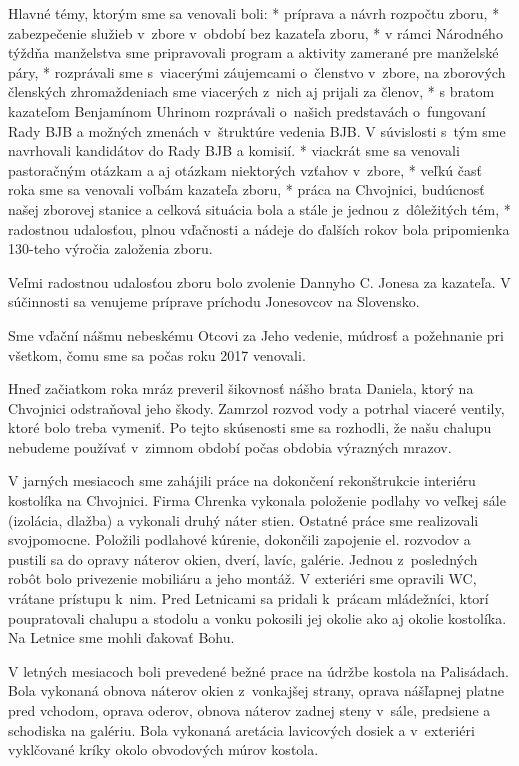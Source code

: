 Hlavné témy, ktorým sme sa venovali boli:
\begitems
* príprava a návrh rozpočtu zboru,
* zabezpečenie služieb v~zbore v~období bez kazateľa zboru,
* v rámci Národného týždňa manželstva sme pripravovali program a aktivity zamerané pre manželské páry,
* rozprávali sme s~viacerými záujemcami o~členstvo v~zbore, na zborových členských zhromaždeniach sme viacerých z~nich aj prijali za členov,
* s bratom kazateľom Benjamínom Uhrinom rozprávali o~našich predstavách o~fungovaní Rady BJB a možných zmenách v~štruktúre vedenia BJB. V súvislosti s~tým sme navrhovali kandidátov do Rady BJB a komisií.
* viackrát sme sa venovali pastoračným otázkam a aj otázkam niektorých vzťahov v~zbore,
* veľkú časť roka sme sa venovali voľbám kazateľa zboru,
* práca na Chvojnici, budúcnosť našej zborovej stanice a celková situácia bola a stále je jednou z~dôležitých tém,
* radostnou udalosťou, plnou vďačnosti a nádeje do ďalších rokov bola pripomienka 130-teho výročia založenia zboru.
\enditems

Veľmi radostnou udalosťou zboru bolo zvolenie Dannyho C. Jonesa za kazateľa. V súčinnosti sa venujeme príprave príchodu Jonesovcov na Slovensko.

Sme vďační nášmu nebeskému Otcovi za Jeho vedenie, múdrosť a požehnanie pri všetkom, čomu sme sa počas roku 2017 venovali.



Hneď začiatkom roka mráz preveril šikovnosť nášho brata Daniela, ktorý na Chvojnici odstraňoval jeho škody. Zamrzol rozvod vody a potrhal viaceré ventily, ktoré bolo treba vymeniť. Po tejto skúsenosti sme sa rozhodli, že našu chalupu nebudeme používať v~zimnom období počas obdobia výrazných mrazov.

V jarných mesiacoch sme zahájili práce na dokončení rekonštrukcie interiéru kostolíka na Chvojnici. Firma Chrenka vykonala položenie podlahy vo veľkej sále (izolácia, dlažba) a vykonali druhý náter stien. Ostatné práce sme realizovali svojpomocne. Položili podlahové kúrenie,  dokončili zapojenie el. rozvodov a  pustili sa do opravy náterov okien,  dverí, lavíc, galérie. Jednou z~posledných robôt bolo privezenie mobiliáru a jeho montáž. V exteriéri sme opravili WC, vrátane prístupu k~nim. Pred Letnicami sa pridali k~prácam mládežníci, ktorí poupratovali chalupu a stodolu a vonku pokosili jej okolie ako aj okolie kostolíka.
Na Letnice sme mohli ďakovať Bohu.

V letných mesiacoch boli prevedené bežné prace na údržbe kostola na Palisádach. Bola vykonaná obnova náterov okien z~vonkajšej strany, oprava nášľapnej platne pred vchodom, oprava oderov, obnova náterov zadnej steny v~sále, predsiene a schodiska na galériu. Bola vykonaná aretácia lavicových dosiek a v~exteriéri vyklčované kríky okolo obvodových múrov kostola.

